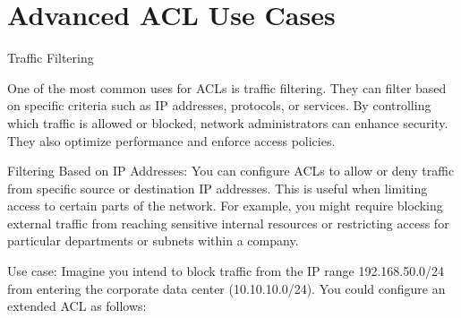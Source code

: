\documentclass[11pt,a4paper]{article}
\begin{document}
\section*{Advanced ACL Use Cases}


\newpage








Traffic Filtering

One of the most common uses for ACLs is traffic filtering. They can filter based on specific criteria such as IP addresses, protocols, or services. By controlling which traffic is allowed or blocked, network administrators can enhance security. They also optimize performance and enforce access policies.

Filtering Based on IP Addresses:
You can configure ACLs to allow or deny traffic from specific source or destination IP addresses. This is useful when limiting access to certain parts of the network. For example, you might require blocking external traffic from reaching sensitive internal resources or restricting access for particular departments or subnets within a company.

Use case: Imagine you intend to block traffic from the IP range 192.168.50.0/24 from entering the corporate data center (10.10.10.0/24). You could configure an extended ACL as follows:



\newpage


\begin{multicols}{2}
    \small
    
    \makeatletter
  \renewcommand\@biblabel[1]{#1.} 
    
   
\end{multicols}
  
\end{document}
